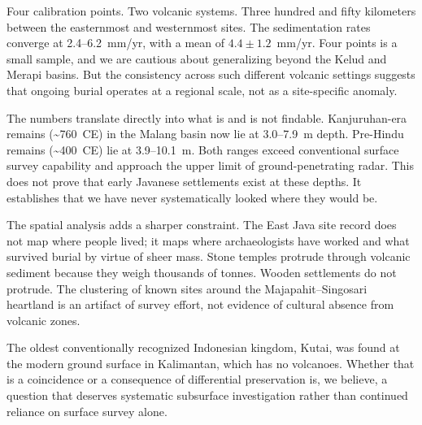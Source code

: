 \documentclass[egqsj, manuscript]{copernicus}
\begin{document}
\conclusions

Four calibration points. Two volcanic systems. Three hundred and fifty kilometers between the easternmost and westernmost sites. The sedimentation rates converge at 2.4--6.2~mm/yr, with a mean of $4.4 \pm 1.2$~mm/yr. Four points is a small sample, and we are cautious about generalizing beyond the Kelud and Merapi basins. But the consistency across such different volcanic settings suggests that ongoing burial operates at a regional scale, not as a site-specific anomaly.

The numbers translate directly into what is and is not findable. Kanjuruhan-era remains (\textasciitilde760~CE) in the Malang basin now lie at 3.0--7.9~m depth. Pre-Hindu remains (\textasciitilde400~CE) lie at 3.9--10.1~m. Both ranges exceed conventional surface survey capability and approach the upper limit of ground-penetrating radar. This does not prove that early Javanese settlements exist at these depths. It establishes that we have never systematically looked where they would be.

The spatial analysis adds a sharper constraint. The East Java site record does not map where people lived; it maps where archaeologists have worked and what survived burial by virtue of sheer mass. Stone temples protrude through volcanic sediment because they weigh thousands of tonnes. Wooden settlements do not protrude. The clustering of known sites around the Majapahit--Singosari heartland is an artifact of survey effort, not evidence of cultural absence from volcanic zones.

The oldest conventionally recognized Indonesian kingdom, Kutai, was found at the modern ground surface in Kalimantan, which has no volcanoes. Whether that is a coincidence or a consequence of differential preservation is, we believe, a question that deserves systematic subsurface investigation rather than continued reliance on surface survey alone.




\end{document}
